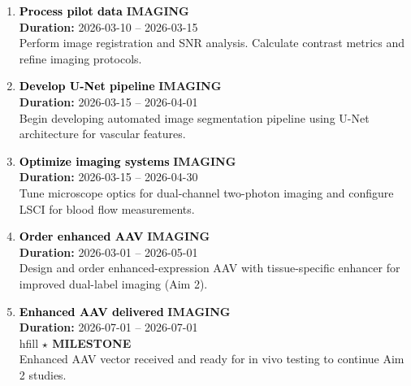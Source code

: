 \documentclass[a4paper]{article}
\newcommand{\cellcolor}[2]{\colorbox{#1}{#2}}
\begin{document}
\begin{enumerate}[leftmargin=0.3cm, itemsep=0.3em, parsep=0.1em, topsep=0.1em]
    \item \textcolor{black}{\textbf{\Large Process pilot data}}
          \hfill \cellcolor{black!15}{\textbf{\small IMAGING}}
          \\ \textcolor{black!60}{\textbf{Duration:} 2026-03-10 -- 2026-03-15} \\ \textcolor{black!80}{\small Perform image registration and SNR analysis. Calculate contrast metrics and refine imaging protocols.}

    \item \textcolor{black}{\textbf{\Large Develop U-Net pipeline}}
          \hfill \cellcolor{black!15}{\textbf{\small IMAGING}}
          \\ \textcolor{black!60}{\textbf{Duration:} 2026-03-15 -- 2026-04-01} \\ \textcolor{black!80}{\small Begin developing automated image segmentation pipeline using U-Net architecture for vascular features.}

    \item \textcolor{black}{\textbf{\Large Optimize imaging systems}}
          \hfill \cellcolor{black!15}{\textbf{\small IMAGING}}
          \\ \textcolor{black!60}{\textbf{Duration:} 2026-03-15 -- 2026-04-30} \\ \textcolor{black!80}{\small Tune microscope optics for dual-channel two-photon imaging and configure LSCI for blood flow measurements.}

    \item \textcolor{black}{\textbf{\Large Order enhanced AAV}}
          \hfill \cellcolor{black!15}{\textbf{\small IMAGING}}
          \\ \textcolor{black!60}{\textbf{Duration:} 2026-03-01 -- 2026-05-01} \\ \textcolor{black!80}{\small Design and order enhanced-expression AAV with tissue-specific enhancer for improved dual-label imaging (Aim 2).}

    \item \textcolor{black}{\textbf{\Large Enhanced AAV delivered}}
          \hfill \cellcolor{black!15}{\textbf{\small IMAGING}}
          \\ \textcolor{black!60}{\textbf{Duration:} 2026-07-01 -- 2026-07-01} \\hfill \textcolor{milestone}{\textbf{$\star$ MILESTONE}} \\ \textcolor{black!80}{\small Enhanced AAV vector received and ready for in vivo testing to continue Aim 2 studies.}


\end{enumerate}
\end{document}
